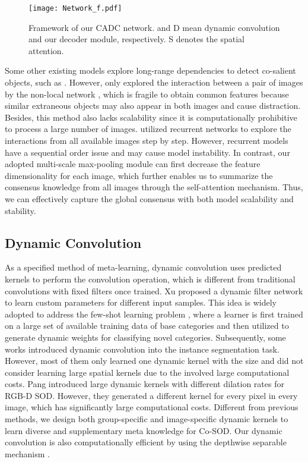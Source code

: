 \documentclass[10pt,twocolumn,letterpaper]{article}
\begin{document}
\begin{figure*}[!t]
  \graphicspath{{Figures/Network/}}
  \centering
  \texttt{[image: Network\_f.pdf]}
  \caption{Framework of our CADC network.  and \textcircled{\small{D}} mean dynamic convolution and our decoder module, respectively. \textcircled{\small{S}} denotes the spatial attention.}
  \label{network_fig}
  \vspace{-0.3cm}
\end{figure*}

Some other existing models explore long-range dependencies to detect co-salient objects, such as \cite{gao2020co,li2019detecting}. However, \cite{gao2020co} only explored the interaction between a pair of images by the non-local network \cite{wang2018non}, which is fragile to obtain common features because similar extraneous objects may also appear in both images and cause distraction. Besides, this method also lacks scalability since it is computationally prohibitive to process a large number of images. \cite{li2019detecting} utilized recurrent networks to explore the interactions from all available images step by step. However, recurrent models have a sequential order issue and may cause model instability. In contrast, our adopted multi-scale max-pooling module can first decrease the feature dimensionality for each image, which further enables us to summarize the consensus knowledge from all images through the self-attention mechanism. Thus, we can effectively capture the global consensus with both model scalability and stability.

\subsection{Dynamic Convolution}
As a specified method of meta-learning, dynamic convolution uses predicted kernels to perform the convolution operation, which is different from traditional convolutions with fixed filters once trained. Xu \etal \cite{jia2016dynamic} proposed a dynamic filter network to learn custom parameters for different input samples. This idea is widely adopted to address the few-shot learning problem \cite{cai2018memory, gidaris2018dynamic}, where a learner is first trained on a large set of available training data of base categories and then utilized to generate dynamic weights for classifying novel categories.
Subsequently, some works \cite{qi2020pointins,tian2020conditional} introduced dynamic convolution into the instance segmentation task.
However, most of them only learned one dynamic kernel with the  size and did not consider learning large spatial kernels due to the involved large computational costs. Pang \etal \cite{HDFNetECCV2020} introduced large  dynamic kernels with different dilation rates for RGB-D SOD. However, they generated a different kernel for every pixel in every image, which has significantly large computational costs. Different from previous methods, we design both group-specific and image-specific dynamic kernels to learn diverse and supplementary meta knowledge for Co-SOD. Our dynamic convolution is also computationally efficient by using the depthwise separable mechanism \cite{howard2017mobilenets}.
\end{document}
